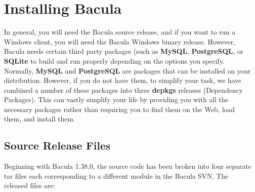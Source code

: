 
\chapter{Installing Bacula}
\label{InstallChapter}

In general, you will need the Bacula source release, and if you want to run
a Windows client, you will need the Bacula Windows binary release.
However, Bacula needs certain third party packages (such as {\bf MySQL},
{\bf PostgreSQL}, or {\bf SQLite} to build and run
properly depending on the
options you specify.  Normally, {\bf MySQL} and {\bf PostgreSQL} are
packages that can be installed on your distribution.  However, if you do
not have them, to simplify your task, we have combined a number of these
packages into three {\bf depkgs} releases (Dependency Packages).  This can
vastly simplify your life by providing you with all the necessary packages
rather than requiring you to find them on the Web, load them, and install
them.

\section{Source Release Files}
 Beginning with Bacula 1.38.0, the source code has been broken into
 four separate tar files each corresponding to a different module in
 the Bacula SVN. The released files are:

